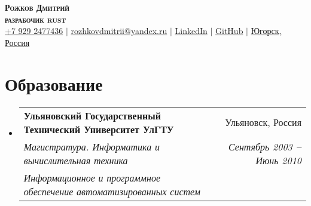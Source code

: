 \documentclass[letterpaper,11pt]{article}
\makeatletter
\newcommand{\resumeItem}[1]{
  \item\small{
    {#1 \vspace{-2pt}}
  }
}
\newcommand{\resumeEducationHeading}[6]{
  \vspace{-2pt}\item
    \begin{tabular*}{0.97\textwidth}[t]{l@{\extracolsep{\fill}}r}
      \textbf{#1} & #2 \\
      \textit{\small#3} & \textit{\small #4} \\
      \textit{\small#5} & \textit{\small #6} \\
    \end{tabular*}\vspace{-5pt}
}
\newcommand{\resumeSubHeadingListStart}{\begin{itemize}[leftmargin=0.15in, label={}]}
\newcommand{\resumeSubHeadingListEnd}{\end{itemize}}
\newcommand{\resumeItemListStart}{\begin{itemize}}
\newcommand{\resumeItemListEnd}{\end{itemize}\vspace{-5pt}}
\makeatother
\begin{document}

\begin{center}
    \textbf{\Huge \scshape Рожков Дмитрий} \\ \vspace{3pt}
    \textbf{\large \scshape разрабочик rust} \\ \vspace{3pt}
    \small
    \faMobile \hspace{.5pt} \href{tel:79292477436}{+7 929 2477436}
    $|$
    \faAt \hspace{.5pt} \href{mailto:rozhkovdmitrii@yandex.ru}{rozhkovdmitrii@yandex.ru}
    $|$
    \faLinkedinSquare \hspace{.5pt} \href{https://www.linkedin.com/in/dmitrii-rozhkov-596041107/}{LinkedIn}
    $|$
    \faGithub \hspace{.5pt} \href{https://github.com/rozhkovdmitrii}{GitHub}
    $|$
    \faMapMarker \hspace{.5pt} \href{https://goo.gl/maps/CAPxEvSmreu9ZjjHA}{Югорск, Россия}
\end{center}




\section{Образование}
  \vspace{3pt}
  \resumeSubHeadingListStart
    
    \resumeEducationHeading
      {Ульяновский Государственный Технический Университет УлГТУ
      }{Ульяновск, Россия}
      {Магистратура. Информатика и вычислительная техника }{Сентябрь 2003 \textbf{--} Июнь 2010}
      {Информационное и программное обеспечение автоматизированных систем}{}
    
    
  \resumeSubHeadingListEnd

\end{document}
